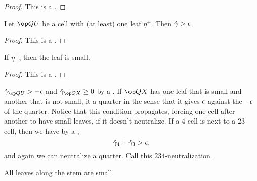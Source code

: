 \begin{proof} This is a .
\end{proof}

\begin{lemma} 
Let $\QU$ be a cell with (at least) one leaf $\eta^+$.  Then $\check\gamma > \epsilon$.
\end{lemma}

\begin{proof} This is a .
\end{proof}

\begin{lemma} If $\eta^-$, then the leaf is small.
\end{lemma}

\begin{proof} This is a .
\end{proof}

\begin{remark}[neutralize]
 $\gg_{\QU} > -\eps$ and $\gg_{\QX}\ge 0$ by a .
If $\QX$ has one leaf that is small and another that is not small, 
it  a quarter in the
sense that it gives $\epsilon$ against the $-\epsilon$ of the quarter.
Notice that this condition propagates, forcing one cell after another to have
small leaves, if it doesn't neutralize.
If a $4$-cell is next to a $23$-cell, then we have by a ,
\[
\check\gamma_4 + \check\gamma_3 > \epsilon,
\]
and again we can neutralize a quarter.  Call this $234$-neutralization.
\end{remark}

\begin{lemma}  All leaves along the stem are small.
\end{lemma}

